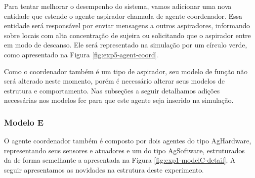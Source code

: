 Para tentar melhorar o desempenho do sistema, vamos adicionar uma nova entidade que estende o agente aspirador chamada de agente coordenador. Essa entidade será responsável por enviar mensagens a outros aspiradores, informando sobre locais com alta concentração de sujeira ou solicitando que o aspirador entre em modo de descanso.  Ele será representado na simulação por um círculo verde, como apresentado na Figura \ref{fig:exp5-agent-coord}.

\begin{figure}[h!]
    \centering
\end{figure}

Como o coordenador também é um tipo de aspirador, seu modelo de função não será alterado neste momento, porém é necessário alterar seus modelos de estrutura e comportamento. Nas subseções a seguir detalhamos adições necessárias nos modelos \acrshort{fec} para que este agente seja inserido na simulação.  

\subsubsection{Modelo E}

O agente coordenador também é composto por dois agentes do tipo AgHardware, representando seus sensores e atuadores e um do tipo AgSoftware, estruturados da de forma semelhante a apresentada na Figura \ref{fig:exp1-modelC-detail}. A seguir apresentamos as novidades na estrutura deste experimento. 

